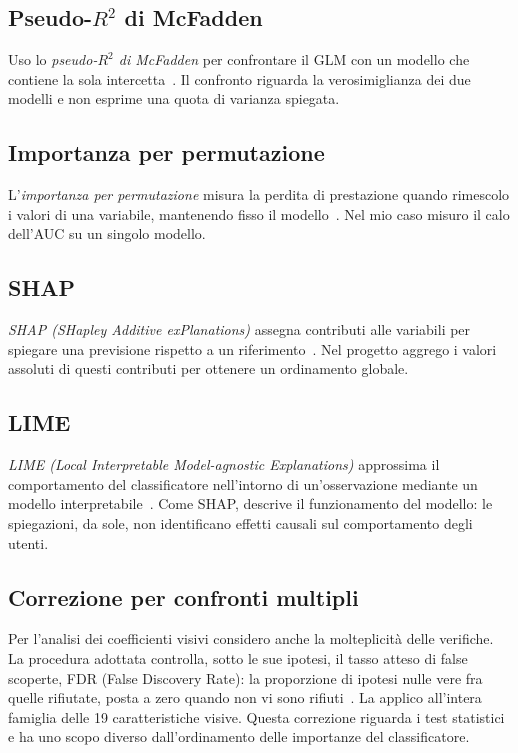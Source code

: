 \subsection{Pseudo-\texorpdfstring{$R^2$}{R2} di McFadden}
\label{subsec:background-mcfadden}

Uso lo \emph{pseudo-$R^2$ di McFadden} per confrontare il GLM con un modello che contiene la sola intercetta~\cite{mcfadden1972conditional}. Il confronto riguarda la verosimiglianza dei due modelli e non esprime una quota di varianza spiegata.

\subsection{Importanza per permutazione}
\label{subsec:background-permutazione}

L'\emph{importanza per permutazione} misura la perdita di prestazione quando rimescolo i valori di una variabile, mantenendo fisso il modello~\cite{JMLR:v20:18-760}. Nel mio caso misuro il calo dell'AUC su un singolo modello.

\subsection{SHAP}
\label{subsec:background-shap}

\emph{SHAP (SHapley Additive exPlanations)} assegna contributi alle variabili per spiegare una previsione rispetto a un riferimento~\cite{NIPS2017_8a20a862}. Nel progetto aggrego i valori assoluti di questi contributi per ottenere un ordinamento globale.

\subsection{LIME}
\label{subsec:background-lime}

\emph{LIME (Local Interpretable Model-agnostic Explanations)} approssima il comportamento del classificatore nell'intorno di un'osservazione mediante un modello interpretabile~\cite{ribeiro2016whyitrustyou}. Come SHAP, descrive il funzionamento del modello: le spiegazioni, da sole, non identificano effetti causali sul comportamento degli utenti.

\subsection{Correzione per confronti multipli}
\label{subsec:background-benjamini-hochberg}

Per l'analisi dei coefficienti visivi considero anche la molteplicità delle verifiche. La procedura adottata controlla, sotto le sue ipotesi, il tasso atteso di false scoperte, FDR (False Discovery Rate): la proporzione di ipotesi nulle vere fra quelle rifiutate, posta a zero quando non vi sono rifiuti~\cite{10.1111/j.2517-6161.1995.tb02031.x}. La applico all'intera famiglia delle 19 caratteristiche visive. Questa correzione riguarda i test statistici e ha uno scopo diverso dall'ordinamento delle importanze del classificatore.
